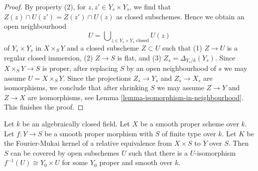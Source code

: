 \begin{proof}
\noindent
By property (2), for $z, z' \in Y_s \times Y_s$, we
find that $Z(z) \cap U(z') = Z(z') \cap U(z)$ as closed subschemes.
Hence we obtain an open neighbourhood
$$
U = \bigcup\nolimits_{z \in Y_s \times Y_s\text{ closed}} U(z)
$$
of $Y_s \times Y_s$ in $X \times_S Y$ and a closed subscheme $Z \subset U$
such that (1) $Z \to U$ is a regular closed immersion,
(2) $Z \to S$ is flat, and (3) $Z_s = \Delta_{Y_s/k}(Y_s)$.
Since $X \times_S Y \to S$ is proper, after replacing $S$
by an open neighbourhood of $s$ we may assume $U = X \times_S Y$.
Since the projections $Z_s \to Y_s$ and $Z_s \to X_s$
are isomorphisms, we conclude that after shrinking $S$
we may assume $Z \to Y$ and $Z \to X$ are isomorphisms, see
Lemma \ref{lemma-isomorphism-in-neighbourhood}.
This finishes the proof.
\end{proof}

\begin{lemma}
\label{lemma-no-deformations-better}
Let $k$ be an algebraically closed field. Let $X$
be a smooth proper scheme over $k$.
Let $f : Y \to S$ be a smooth proper morphism with $S$ of finite type over $k$.
Let $K$ be the Fourier-Mukai kernel of a relative equivalence
from $X \times S$ to $Y$ over $S$. Then $S$ can be covered by
open subschemes $U$ such that there is a $U$-isomorphism
$f^{-1}(U) \cong Y_0 \times U$ for some $Y_0$ proper and smooth over $k$.
\end{lemma}

